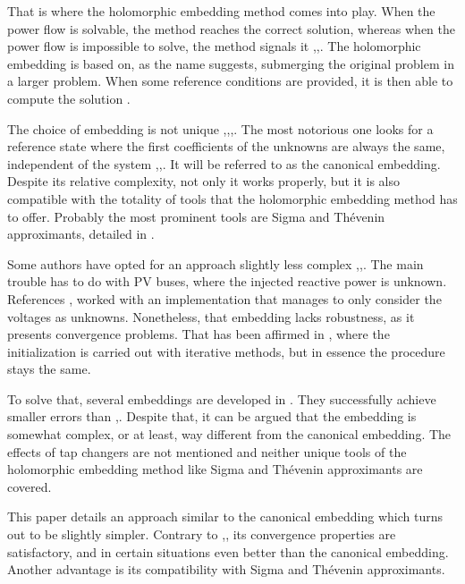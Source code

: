 \documentclass[journal]{IEEEtran}
\begin{document}
That is where the holomorphic embedding method comes into play. When the power flow is solvable, the method reaches the correct solution, whereas when the power flow is impossible to solve, the method signals it \cite{Trias2012},\cite{Trias2018},\cite{Trias_sigma}. The holomorphic embedding is based on, as the name suggests, submerging the original problem in a larger problem. When some reference conditions are provided, it is then able to compute the solution \cite{Trias2018}.

The choice of embedding is not unique \cite{Novel},\cite{Trias2018},\cite{TriasMarin},\cite{Schmidt}. The most notorious one looks for a reference state where the first coefficients of the unknowns are always the same, independent of the system \cite{Trias2018},\cite{Rao},\cite{Tylavsky3}. It will be referred to as the canonical embedding. Despite its relative complexity, not only it works properly, but it is also compatible with the totality of tools that the holomorphic embedding method has to offer. Probably the most prominent tools are Sigma and Thévenin approximants, detailed in \cite{Trias2018}. 

Some authors have opted for an approach slightly less complex \cite{Novel},\cite{Schmidt},\cite{subramanianPV}. The main trouble has to do with PV buses, where the injected reactive power is unknown. References \cite{Schmidt},\cite{Subramanian} worked with an implementation that manages to only consider the voltages as unknowns. Nonetheless, that embedding lacks robustness, as it presents convergence problems. That has been affirmed in \cite{Novel}, where the initialization is carried out with iterative methods, but in essence the procedure stays the same. 

To solve that, several embeddings are developed in \cite{wallace}. They successfully achieve smaller errors than \cite{subramanianPV},\cite{Subramanian}. Despite that, it can be argued that the embedding is somewhat complex, or at least, way different from the canonical embedding. The effects of tap changers are not mentioned and neither unique tools of the holomorphic embedding method like Sigma and Thévenin approximants are covered. 

This paper details an approach similar to the canonical embedding which turns out to be slightly simpler. Contrary to \cite{Novel},\cite{Schmidt},\cite{subramanianPV} its convergence properties are satisfactory, and in certain situations even better than the canonical embedding. Another advantage is its compatibility with Sigma and Thévenin approximants. 
\end{document}
